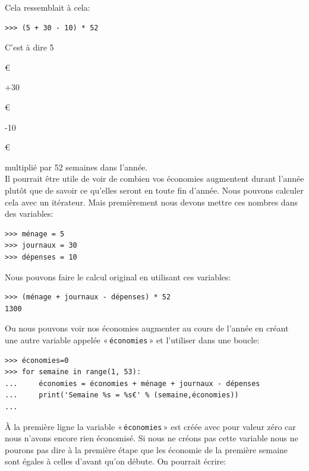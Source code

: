 Cela ressemblait à cela:

\begin{Verbatim}[frame=single,rulecolor=\color{gray}, label=ne pas saisir]
>>> (5 + 30 - 10) * 52
\end{Verbatim}

C'est à dire 5\begin{small}\euro\end{small}+30\begin{small}\euro\end{small}-10\begin{small}\euro\end{small} multiplié par 52 semaines dans l'année.\\

Il pourrait être utile de voir de combien vos économies augmentent durant l'année plutôt que de savoir ce qu'elles seront en toute fin d'année. Nous pouvons calculer cela avec un itérateur. Mais premièrement nous devons mettre ces nombres dans des variables:

\begin{Verbatim}[frame=single,rulecolor=\color{mbleu}, label=à taper]
>>> ménage = 5
>>> journaux = 30
>>> dépenses = 10
\end{Verbatim}

Nous pouvons faire le calcul original en utilisant ces variables:

\begin{Verbatim}[frame=single,rulecolor=\color{mbleu}, label=à taper]
>>> (ménage + journaux - dépenses) * 52
1300
\end{Verbatim}

Ou nous pouvons voir nos économies augmenter au cours de l'année en créant une autre variable appelée « \texttt{économies} » et l'utiliser dans une boucle:

\begin{Verbatim}[frame=single,rulecolor=\color{mbleu}, label=à taper]
>>> économies=0
>>> for semaine in range(1, 53):
...     économies = économies + ménage + journaux - dépenses
...     print('Semaine %s = %s€' % (semaine,économies))
... 
\end{Verbatim}

À la première ligne la variable « \texttt{économies} » est créée avec pour valeur zéro car nous n'avons encore
rien économisé. Si nous ne créons pas cette variable nous ne pourons pas dire à la première étape que les économie de la première semaine sont égales à celles d'avant qu'on débute. On pourrait écrire:

